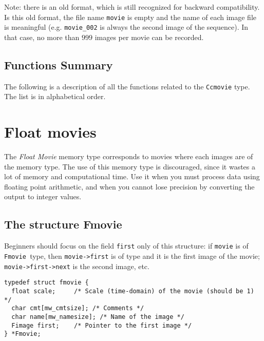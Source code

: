 Note: there is an old format, which is still recognized for backward compatibility. 
Is this old format, the file name \verb+movie+ is empty and the name of each image file is meaningful
(e.g. \verb+movie_002+ is always the second image of the sequence).
In that case, no more than $999$ images per movie can be recorded.

\subsection{Functions Summary}
\label{movies_color-char-movies_function}

The following is a description of all the functions related to 
the \verb+Ccmovie+ type. The list is in alphabetical order.

\newpage %



\section{Float movies}


\label{movies_float-movies}
\def\fmovie{{\tt Fmovie }}
\index{structure!\fmovie}

The {\em Float Movie} memory type corresponds to movies where each images
are of the \fimage memory type. 
The use of this memory type is discouraged, since it wastes a lot of memory and computational time.
Use it when you must process data using floating point arithmetic, and when 
you cannot lose precision by converting the output to integer values.

\subsection{The structure Fmovie}
\label{movies_float-movies_structure}

 Beginners should focus on the field \verb+first+ only of this structure:
if \verb+movie+ is of \fmovie type, then \verb+movie->first+ is of \fimage
type and it is the first image of the movie; \verb+movie->first->next+ is
the second image, etc.

{\small
\begin{verbatim}
typedef struct fmovie {
  float scale;     /* Scale (time-domain) of the movie (should be 1) */
  char cmt[mw_cmtsize]; /* Comments */
  char name[mw_namesize]; /* Name of the image */
  Fimage first;    /* Pointer to the first image */
} *Fmovie;
\end{verbatim}
}

